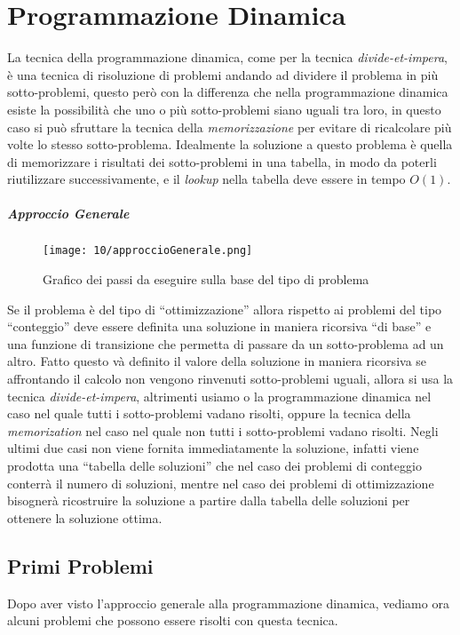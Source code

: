 \chapter{Programmazione Dinamica}

La tecnica della programmazione dinamica, come per la tecnica \textit{divide-et-impera}, è una tecnica di risoluzione di problemi andando ad dividere il problema in più sotto-problemi, questo però con la differenza che nella programmazione dinamica esiste la possibilità che uno o più sotto-problemi siano uguali tra loro, in questo caso si può sfruttare la tecnica della \textit{memorizzazione} per evitare di ricalcolare più volte lo stesso sotto-problema. Idealmente la soluzione a questo problema è quella di memorizzare i risultati dei sotto-problemi in una tabella, in modo da poterli riutilizzare successivamente, e il \textit{lookup} nella tabella deve essere in tempo $O(1)$.

\paragraph{Approccio Generale}
    \begin{figure}[H]
        \centering
        \texttt{[image: 10/approccioGenerale.png]}
        \caption{Grafico dei passi da eseguire sulla base del tipo di problema}
    \end{figure}
    Se il problema è del tipo di ``ottimizzazione'' allora rispetto ai problemi del tipo ``conteggio'' deve essere definita una soluzione in maniera ricorsiva ``di base'' e una funzione di transizione che permetta di passare da un sotto-problema ad un altro. Fatto questo và definito il valore della soluzione in maniera ricorsiva se affrontando il calcolo non vengono rinvenuti sotto-problemi uguali, allora si usa la tecnica \textit{divide-et-impera}, altrimenti usiamo o la programmazione dinamica nel caso nel quale tutti i sotto-problemi vadano risolti, oppure la tecnica della \textit{memorization} nel caso nel quale non tutti i sotto-problemi vadano risolti.\newline
    Negli ultimi due casi non viene fornita immediatamente la soluzione, infatti viene prodotta una ``tabella delle soluzioni'' che nel caso dei problemi di conteggio conterrà il numero di soluzioni, mentre nel caso dei problemi di ottimizzazione bisognerà ricostruire la soluzione a partire dalla tabella delle soluzioni per ottenere la soluzione ottima.

\newpage
\section{Primi Problemi}
    Dopo aver visto l'approccio generale alla programmazione dinamica, vediamo ora alcuni problemi che possono essere risolti con questa tecnica.
